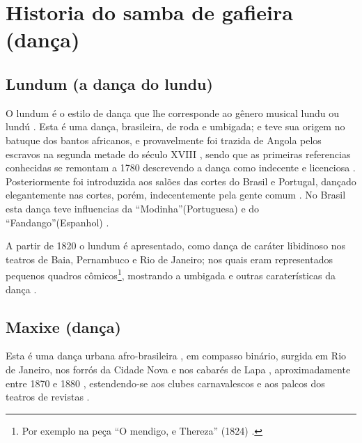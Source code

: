 

\chapter{Historia do samba de gafieira  (dança)}
\label{cap:sambagafieira}


\section{Lundum (a dança do lundu)} 
\label{sec:lundu}
O lundum é o estilo de dança que lhe corresponde ao gênero musical lundu \cite[pp. 18]{perna2002samba} ou lundú \cite[pp. 8]{Lundu1824RJ}.
Esta é uma dança, brasileira, de roda e umbigada; e teve sua origem no batuque dos bantos africanos,
e provavelmente foi trazida de Angola pelos escravos na segunda metade do século XVIII 
\cite[pp. 48]{tinhorao1986pequena} \cite[pp. 188]{dourado2004dicionario},
sendo que as primeiras referencias conhecidas se remontam a 1780 
descrevendo a dança como indecente e licenciosa \cite[pp. 51]{tinhorao1986pequena} \cite[pp. 19]{perna2002samba}.
Posteriormente foi introduzida aos salões das cortes do Brasil e Portugal, 
dançado elegantemente nas cortes, porém, indecentemente pela gente comum   
\cite[pp. 19]{perna2002samba} \cite[pp. 188]{dourado2004dicionario}.
No Brasil esta dança teve influencias da ``Modinha''(Portuguesa) e do ``Fandango''(Espanhol) \cite[pp. 188]{dourado2004dicionario}.

A partir de 1820 o lundum é apresentado, como dança de caráter libidinoso nos teatros de Baia, Pernambuco e Rio de Janeiro;
nos quais eram representados pequenos quadros cômicos\footnote{Por exemplo na peça ``O mendigo, e Thereza'' (1824) \cite[pp. 8]{Lundu1824RJ}.}, 
mostrando a umbigada e outras caraterísticas da dança \cite[pp. 19]{perna2002samba}.


\section{Maxixe (dança)}
\label{sec:maxixe}
Esta é uma dança urbana afro-brasileira \cite[pp. 4]{musicasambavariasdef1}, 
em compasso binário, surgida em Rio de Janeiro, 
nos forrós da Cidade Nova e nos cabarés de Lapa \cite[pp. 465]{marcondes1977enciclopedia}  \cite[pp. 198]{dourado2004dicionario}, 
aproximadamente entre 1870 e 1880 
\cite[pp. 58]{tinhorao1986pequena} \cite[pp. 465]{marcondes1977enciclopedia}  \cite[pp. 62]{reinato2010musica},
estendendo-se  aos clubes carnavalescos e aos palcos dos teatros de revistas \cite[pp. 465]{marcondes1977enciclopedia}.

